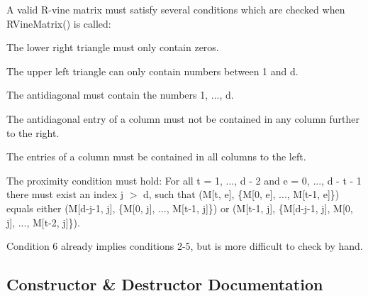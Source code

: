A valid R-\/vine matrix must satisfy several conditions which are checked when {\ttfamily R\+Vine\+Matrix()} is called\+:
\begin{DoxyEnumerate}
\item The lower right triangle must only contain zeros.
\item The upper left triangle can only contain numbers between 1 and d.
\item The antidiagonal must contain the numbers 1, ..., d.
\item The antidiagonal entry of a column must not be contained in any column further to the right.
\item The entries of a column must be contained in all columns to the left.
\item The proximity condition must hold\+: For all t = 1, ..., d -\/ 2 and e = 0, ..., d -\/ t -\/ 1 there must exist an index j $>$ d, such that {\ttfamily (M\mbox{[}t, e\mbox{]}, \{M\mbox{[}0, e\mbox{]}, ..., M\mbox{[}t-\/1, e\mbox{]}\})} equals either {\ttfamily (M\mbox{[}d-\/j-\/1, j\mbox{]}, \{M\mbox{[}0, j\mbox{]}, ..., M\mbox{[}t-\/1, j\mbox{]}\})} or {\ttfamily (M\mbox{[}t-\/1, j\mbox{]}, \{M\mbox{[}d-\/j-\/1, j\mbox{]}, M\mbox{[}0, j\mbox{]}, ..., M\mbox{[}t-\/2, j\mbox{]}\})}.
\end{DoxyEnumerate}

Condition 6 already implies conditions 2-\/5, but is more difficult to check by hand. 

\subsection{Constructor \& Destructor Documentation}

